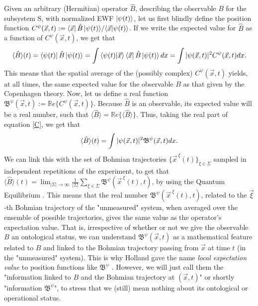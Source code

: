 \documentclass[11pt, a4paper]{article} %
\newcommand{\B}{\mathfrak{B}}
\begin{document}
Given an arbitrary (Hermitian) operator $\hat{B}$, describing the observable $B$ for the subsystem S, with normalized EWF $\ket{\psi(t)}$, let us first blindly define the position function $C^{\psi}(\vec{x},t):={\bra{\vec{x}}\hat{B}\ket{\psi(t)}}/{\bra{\vec{x}}\ket{\psi(t)}}$. If we write the expected value for $\hat{B}$ as a function of $C^\psi(\vec{x},t)$, we get that\vspace{-0.15cm}
\begin{equation}\label{C}
\langle \hat{B}\rangle(t)= \bra{\psi(t)}\hat{B}\ket{\psi(t)}=\int \bra{\psi(t)} \ket{\vec{x}}\bra{\vec{x}}\hat{B}\ket{\psi(t)}dx =  \int |\psi(\vec{x},t)|^2C^\psi(\vec{x},t)dx.\vspace{-0.1cm}
\end{equation}
This means that the spatial average of the (possibly complex) $C^\psi(\vec{x},t)$ yields, at all times, the same expected value for the observable $B$ as that given by the Copenhagen theory. Now, let us define a real function $\B^\psi(\vec{x},t):=\mathbb{R}e\{C^{\psi}(\vec{x},t)\}$. Because $\hat{B}$ is an observable, its expected value will be a real number, such that $\langle \hat{B}\rangle=\mathbb{R}e\{\langle \hat{B}\rangle\}$. Thus, taking the real part of equation \eqref{C}, we get that\vspace{-0.1cm}
\begin{equation}
\langle \hat{B}\rangle(t)=\int |\psi(\vec{x},t)|^2\B^\psi(\vec{x},t)dx.\vspace{-0.1cm}
\end{equation}
We can link this with the set of Bohmian trajectories $\{\vec{x}^{\:\xi}(t)\}_{\xi\in\Sigma}$ sampled in independent repetitions of the experiment, to get that $\langle \hat{B}\rangle(t)=\lim_{|\Sigma|\rightarrow \infty}\frac{1}{|\Sigma|} \sum_{\xi\in\Sigma} \B^\psi(\vec{x}^{\:\xi}(t),t)$, by
using the Quantum Equilibrium \cite{Absolute}. This means that the real number $\B^\psi(\vec{x}^{\;\xi}(t),t)$, related to the $\vec{\xi}$-th Bohmian trajectory of the "unmeasured" system, when averaged over the ensemble of possible trajectories, gives the same value as the operator's expectation value. That is, irrespective of whether or not we give the observable $B$ an ontological status, we can understand $\B^\psi(\vec{x},t)$ as a mathematical feature related to $B$ and linked to the Bohmian trajectory passing from $\vec{x}$ at time $t$ (in the "unmeasured" system). This is why Holland gave the name {\em local expectation value} to position functions like $\B^\psi$ \cite{Holland}. However, we will just call them the "information linked to $B$ and the Bohmian trajectory at $(\vec{x},t)$" or shortly "information $\B^\psi$", to stress that we (still) mean nothing about its ontological or operational status.
\end{document}
